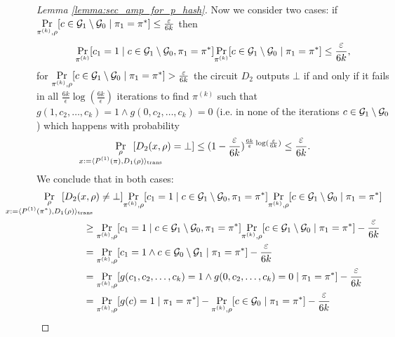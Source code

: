 \begin{proof}[Lemma \ref{lemma:sec_amp_for_p_hash}]
Now we consider two cases:
if $\underset{\pi^{(k)}, \rho}{\Pr}[ c \in \mathcal{G}_1 \setminus \mathcal{G}_0 \mid \pi_1 = \pi^*] \leq \frac{\varepsilon}{6k}$ then
\begin{align}
  \underset{\pi^{(k)}}{\Pr}[c_1 = 1 \mid c \in \mathcal{G}_1 \setminus \mathcal{G}_0, \pi_1 = \pi^*] \underset{\pi^{(k)}}{\Pr}[c \in \mathcal{G}_1 \setminus \mathcal{G}_0 \mid \pi_1 = \pi^*] \leq \frac{\varepsilon}{6k},
\end{align}
for $\underset{\pi^{(k)}, \rho}{\Pr}[c \in \mathcal{G}_1 \setminus \mathcal{G}_0 \mid \pi_1 = \pi^*] > \frac{\varepsilon}{6k}$ the circuit $D_2$ outputs $\bot$
if and only if it fails in all $\frac{6k}{\epsilon} \log(\frac{6k}{\epsilon})$ iterations to find $\pi^{(k)}$ such that $g(1, c_2, \dots, c_k) = 1 \land g(0, c_2, \dots, c_k) = 0$
(i.e. in none of the iterations $c \in \mathcal{G}_1 \setminus \mathcal{G}_0$) which happens with probability
\begin{align}
\underset{
  \mathclap{
    \substack{
      \rho \\
      x := \langle P^{(1)}(\pi), D_1(\rho) \rangle_{\text{trans}}}}}
{\Pr}\mkern13mu[D_2(x,\rho) = \bot]
\leq (1 - \frac{\epsilon}{6k})^{\frac{6k}{\epsilon}\log(\frac{\epsilon}{6k})} \leq \frac{\epsilon}{6k}.
\end{align}
We conclude that in both cases:
\begin{align}
  \label{ineq:first_part}
  &\underset{
    \mathclap{
    \substack{\rho \\
      x := \langle P^{(1)}(\pi^*), D_1(\rho) \rangle_{\text{trans}}}}}
  {\Pr}\mkern13mu[D_2(x,\rho) \neq \bot]
  \underset{\pi^{(k)}, \rho}{\Pr}[c_1 = 1 \mid c \in \cG_1 \setminus \cG_0, \pi_1 = \pi^*]
  \underset{\pi^{(k)}, \rho}{\Pr}[c \in \cG_1 \setminus \cG_0 \mid \pi_1 = \pi^*] \notag\\
  &\IndII \geq \underset{\pi^{(k)}, \rho}{\Pr}[c_1 = 1 \mid c \in \cG_1 \setminus \cG_0, \pi_1 = \pi^*]\underset{\pi^{(k)}, \rho}
  {\Pr}[c \in \cG_1 \setminus \cG_0 \mid \pi_1 = \pi^*] - \frac{\epsilon}{6k} \notag\\
  &\IndII = \underset{\pi^{(k)}, \rho}{\Pr}[c_1 = 1 \land c \in \cG_0 \setminus \cG_1 \mid \pi_1 = \pi^*] - \frac{\epsilon}{6k} \notag\\
  &\IndII = \underset{\pi^{(k)}, \rho}{\Pr}[g(c_1, c_2,\dots, c_k) = 1 \land g(0, c_2, \dots, c_k) = 0 \mid \pi_1 = \pi^*] - \frac{\epsilon}{6k} \notag\\
  &\IndII = \underset{\pi^{(k)}, \rho}{\Pr}[g(c) = 1 \mid \pi_1 = \pi^*] -  \underset{\pi^{(k)}, \rho}{\Pr}[c \in \cG_0 \mid \pi_1 = \pi^*] - \frac{\epsilon}{6k} \notag\\

\end{align}
\end{proof}
